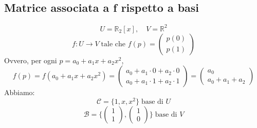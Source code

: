 \documentclass[a4paper]{article}
\theoremstyle{break}
\theoremstyle{break}
\theoremstyle{break}
\theoremstyle{break}
\begin{document}
\subsection{Matrice associata a f rispetto a basi}
\label{7.10}
\begin{example}
  \[
    U = \mathbb{R}_2[x], \quad V = \mathbb{R}^2
  \] 
  \[
  f: U \to V \; \text{tale che } f(p) = \begin{pmatrix} p(0)\\p(1) \end{pmatrix}
  \] 
  Ovvero, per ogni \( p = a_0 + a_1x + a_2 x^2 \),
  \[
    f(p) = f(a_0 + a_1 x + a_2 x^2) = \begin{pmatrix} 
      a_0 + a_1 \cdot 0 + a_2 \cdot 0\\
      a_0 + a_1 \cdot 1 + a_2 \cdot 1
    \end{pmatrix} 
    =
    \begin{pmatrix} 
      a_0\\
      a_0 + a_1 + a_2
    \end{pmatrix} 
  \] 
  Abbiamo:
  \[
  \mathcal{C} = \{1,x,x^2\} \; \text{base di } U
  \] 
  \[
  \mathcal{B} = \{
    \begin{pmatrix} 1\\1 \end{pmatrix} ,
    \begin{pmatrix} 1\\0 \end{pmatrix} 
  \} \; \text{base di } V
  \] 
\begin{figure}[H]
  \centering
  
\end{figure}


\end{example}
\end{document}
